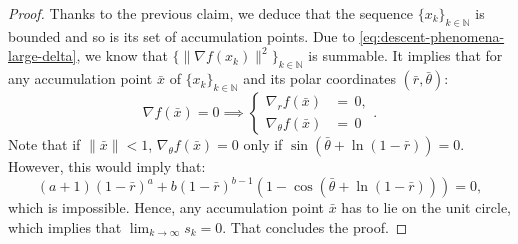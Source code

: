 \documentclass{article}
\theoremstyle{plain}
\theoremstyle{definition}
\theoremstyle{remark}
\newcommand*{\NN}{\mathbb{N}}
\begin{document}
\begin{proof}
    Thanks to the previous claim, we deduce that the sequence $\{x_k\}_{k \in \NN}$ is bounded and so is its set of accumulation points. Due to \eqref{eq:descent-phenomena-large-delta}, we know that $\{\|\nabla f(x_k)\|^2\}_{k \in \NN}$ is summable.
    It implies that for any accumulation point $\bar{x}$ of $\{x_k\}_{k \in \NN}$ and its polar coordinates $(\bar r, \bar \theta)$:
    \begin{equation*}
        \nabla f(\bar{x}) = 0 \implies \begin{cases}
            \nabla_r f(\bar{x}) &= \,0,\\
            \nabla_\theta f(\bar{x}) &= \,0
        \end{cases}.
    \end{equation*}
    Note that if $\|\bar{x}\| < 1$, $\nabla_\theta f(\bar{x}) = 0$ only if $\sin(\bar{\theta} + \ln(1 - \bar{r})) = 0$. However, this would imply that:
    \begin{equation*}
        (a+1)(1 - \bar{r})^{a} + b(1-\bar{r})^{b-1}(1 - \cos(\bar{\theta} + \ln(1 - \bar{r}))) = 0,
    \end{equation*}
which is impossible. Hence, any accumulation point $\bar{x}$ has to lie on the unit circle, which implies that $\lim_{k \to \infty} s_k = 0$. That concludes the proof. 
\end{proof}
\end{document}
